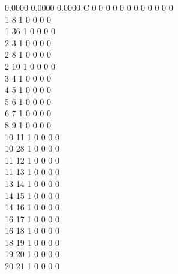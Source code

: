 \documentclass[11pt,titlepage,dvipdfmx,twoside]{jarticle}
\begin{document}
\begin{oframed}
{    0.0000    0.0000    0.0000  C  0  0  0  0  0  0  0  0  0  0  0  0   \\
  1  8  1  0  0  0  0                                                   \\
  1 36  1  0  0  0  0                                                   \\
  2  3  1  0  0  0  0                                                   \\
  2  8  1  0  0  0  0                                                   \\
  2 10  1  0  0  0  0                                                   \\
  3  4  1  0  0  0  0                                                   \\
  4  5  1  0  0  0  0                                                   \\
  5  6  1  0  0  0  0                                                   \\
  6  7  1  0  0  0  0                                                   \\
  8  9  1  0  0  0  0                                                   \\
 10 11  1  0  0  0  0                                                   \\
 10 28  1  0  0  0  0                                                   \\
 11 12  1  0  0  0  0                                                   \\
 11 13  1  0  0  0  0                                                   \\
 13 14  1  0  0  0  0                                                   \\
 14 15  1  0  0  0  0                                                   \\
 14 16  1  0  0  0  0                                                   \\
 16 17  1  0  0  0  0                                                   \\
 16 18  1  0  0  0  0                                                   \\
 18 19  1  0  0  0  0                                                   \\
 19 20  1  0  0  0  0                                                   \\
 20 21  1  0  0  0  0                                                   \\
}
\end{oframed}
\end{document}
